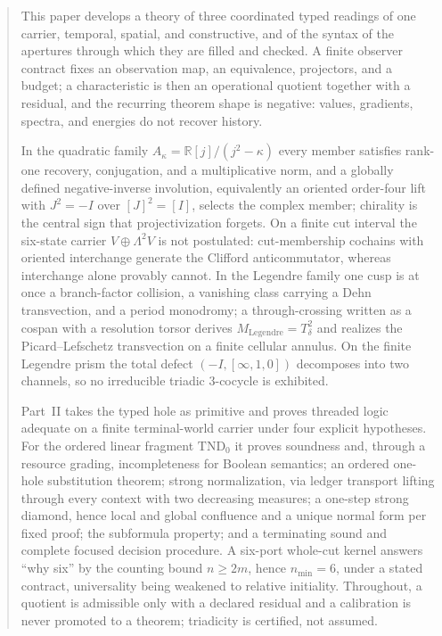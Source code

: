 \documentclass[11pt]{article}
\theoremstyle{definition}
\theoremstyle{remark}
\begin{document}
\begin{abstract}This paper develops a theory of three coordinated typed readings of one carrier,
temporal, spatial, and constructive, and of the syntax of the apertures through
which they are filled and checked.  A finite observer contract fixes an
observation map, an equivalence, projectors, and a budget; a characteristic is then
an operational quotient together with a residual, and the recurring theorem shape is
negative: values, gradients, spectra, and energies do not recover history.

In the quadratic family $A_\kappa=\mathbb R[j]/(j^2-\kappa)$ every member satisfies
rank-one recovery, conjugation, and a multiplicative norm, and a globally defined
negative-inverse involution, equivalently an oriented order-four lift with
$J^2=-I$ over $[J]^2=[I]$, selects the complex member;
chirality is the central sign that projectivization forgets.  On a finite cut
interval the six-state carrier $V\oplus\Lambda^2V$ is not postulated: cut-membership
cochains with oriented interchange generate the Clifford anticommutator, whereas
interchange alone provably cannot.  In the Legendre family one cusp is at once a
branch-factor collision, a vanishing class carrying a Dehn transvection, and a
period monodromy; a through-crossing written as a cospan with a resolution torsor
derives $M_{\mathrm{Legendre}}=T_\delta^2$ and realizes the Picard--Lefschetz
transvection on a finite cellular annulus.  On the finite Legendre
prism the total defect $(-I,[\infty,1,0])$ decomposes into two channels, so no
irreducible triadic $3$-cocycle is exhibited.

Part~II takes the typed hole as primitive and proves threaded logic adequate on a
finite terminal-world carrier under four explicit hypotheses.  For the ordered
linear fragment $\mathrm{TND}_0$ it proves soundness and, through a resource grading,
incompleteness for Boolean semantics; an ordered one-hole substitution theorem; strong normalization, via ledger transport lifting through every
context with two decreasing measures; a one-step strong diamond, hence local and
global confluence and a unique normal form per fixed proof; the subformula property;
and a terminating sound and complete focused decision procedure.  A six-port whole-cut kernel answers ``why six'' by the counting bound
$n\ge 2m$, hence $n_{\min}=6$, under a stated contract, universality being weakened
to relative initiality.  Throughout, a quotient is admissible only with a declared
residual and a calibration is never promoted to a theorem; triadicity is certified,
not assumed.\end{abstract}
\end{document}

